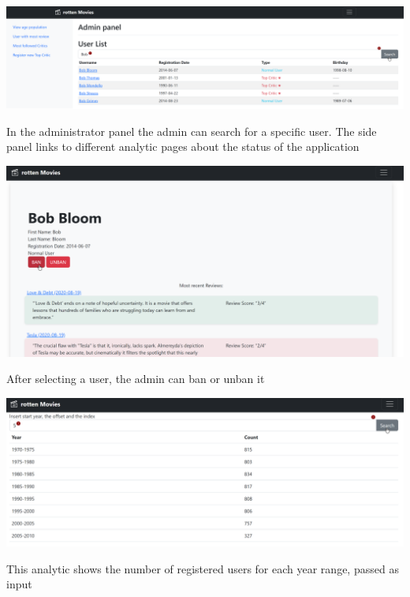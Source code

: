 \begin{center}
\includegraphics[scale=0.45]{../../../images/user_manual/admin_panel_search_user.png} 
\end{center}
\vspace{5pt}
In the administrator panel the admin can search for a specific user. The side panel links to different analytic pages about the status of the application

\begin{center}
\includegraphics[scale=0.45]{../../../images/user_manual/ban_user.png} 
\end{center}
\vspace{5pt}

After selecting a user, the admin can ban or unban it

\begin{center}
\includegraphics[scale=0.45]{../../../images/user_manual/population_by_age.png} 

\end{center}
\vspace{5pt}
This analytic shows the number of registered users for each year range, passed as input

